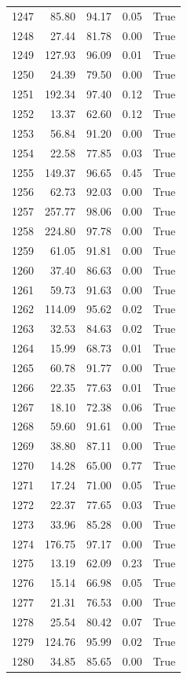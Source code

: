 \begin{longtable}{rrrrr}
1247 & 85.80 & 94.17 & 0.05 & True \\
1248 & 27.44 & 81.78 & 0.00 & True \\
1249 & 127.93 & 96.09 & 0.01 & True \\
1250 & 24.39 & 79.50 & 0.00 & True \\
1251 & 192.34 & 97.40 & 0.12 & True \\
1252 & 13.37 & 62.60 & 0.12 & True \\
1253 & 56.84 & 91.20 & 0.00 & True \\
1254 & 22.58 & 77.85 & 0.03 & True \\
1255 & 149.37 & 96.65 & 0.45 & True \\
1256 & 62.73 & 92.03 & 0.00 & True \\
1257 & 257.77 & 98.06 & 0.00 & True \\
1258 & 224.80 & 97.78 & 0.00 & True \\
1259 & 61.05 & 91.81 & 0.00 & True \\
1260 & 37.40 & 86.63 & 0.00 & True \\
1261 & 59.73 & 91.63 & 0.00 & True \\
1262 & 114.09 & 95.62 & 0.02 & True \\
1263 & 32.53 & 84.63 & 0.02 & True \\
1264 & 15.99 & 68.73 & 0.01 & True \\
1265 & 60.78 & 91.77 & 0.00 & True \\
1266 & 22.35 & 77.63 & 0.01 & True \\
1267 & 18.10 & 72.38 & 0.06 & True \\
1268 & 59.60 & 91.61 & 0.00 & True \\
1269 & 38.80 & 87.11 & 0.00 & True \\
1270 & 14.28 & 65.00 & 0.77 & True \\
1271 & 17.24 & 71.00 & 0.05 & True \\
1272 & 22.37 & 77.65 & 0.03 & True \\
1273 & 33.96 & 85.28 & 0.00 & True \\
1274 & 176.75 & 97.17 & 0.00 & True \\
1275 & 13.19 & 62.09 & 0.23 & True \\
1276 & 15.14 & 66.98 & 0.05 & True \\
1277 & 21.31 & 76.53 & 0.00 & True \\
1278 & 25.54 & 80.42 & 0.07 & True \\
1279 & 124.76 & 95.99 & 0.02 & True \\
1280 & 34.85 & 85.65 & 0.00 & True \\

\end{longtable}

